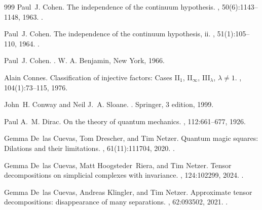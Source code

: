 \begin{thebibliography}{999}
Paul~J. Cohen.
\newblock The independence of the continuum hypothesis.
, 50(6):1143--1148, 1963.
\newblock \href {https://doi.org/10.1073/pnas.50.6.1143}
  {}.

Paul~J. Cohen.
\newblock The independence of the continuum hypothesis, ii.
, 51(1):105--110, 1964.
\newblock \href {https://doi.org/10.1073/pnas.51.1.105}
  {}.

Paul~J. Cohen.
.
\newblock W. A. Benjamin, New York, 1966.

Alain Connes.
\newblock Classification of injective factors: Cases {II}$_1$, {II}$_\infty$,
  {III}$_\lambda$, $\lambda\neq1$.
, 104(1):73--115, 1976.

John~H. Conway and Neil J.~A. Sloane.
.
\newblock Springer, 3 edition, 1999.

 Paul A.~M. Dirac.
\newblock On the theory of quantum mechanics.
, 112:661--677, 1926.

Gemma De~las Cuevas, Tom Drescher, and Tim Netzer.
\newblock Quantum magic squares: Dilations and their limitations.
, 61(11):111704, 2020.
\newblock \href {https://doi.org/10.1063/5.0022344}
  {}.

Gemma De~las Cuevas, Matt Hoogsteder~Riera, and Tim Netzer.
\newblock Tensor decompositions on simplicial complexes with invariance.
, 124:102299, 2024.
\newblock \href {https://doi.org/10.1016/j.jsc.2024.102299}
  {}.

Gemma De~las Cuevas, Andreas Klingler, and Tim Netzer.
\newblock Approximate tensor decompositions: disappearance of many separations.
, 62:093502, 2021.
\newblock \href {https://doi.org/10.1063/5.0033876}
  {}.


\end{thebibliography}
